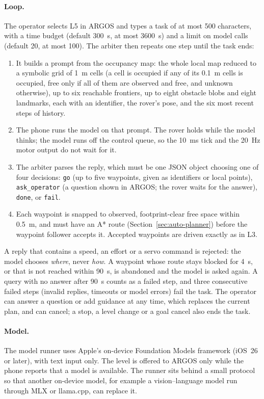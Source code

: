 \paragraph{Loop.}
The operator selects L5 in ARGOS and types a task of at most 500 characters, with a time budget (default 300~s, at most 3600~s) and a limit on model calls (default 20, at most 100).
The arbiter then repeats one step until the task ends:
\begin{enumerate}
\item It builds a prompt from the occupancy map: the whole local map reduced to a symbolic grid of 1~m cells (a cell is occupied if any of its 0.1~m cells is occupied, free only if all of them are observed and free, and unknown otherwise), up to six reachable frontiers, up to eight obstacle blobs and eight landmarks, each with an identifier, the rover's pose, and the six most recent steps of history.
\item The phone runs the model on that prompt. The rover holds while the model thinks; the model runs off the control queue, so the 10~ms tick and the 20~Hz motor output do not wait for it.
\item The arbiter parses the reply, which must be one JSON object choosing one of four decisions: \texttt{go} (up to five waypoints, given as identifiers or local points), \texttt{ask\_operator} (a question shown in ARGOS; the rover waits for the answer), \texttt{done}, or \texttt{fail}.
\item Each waypoint is snapped to observed, footprint-clear free space within 0.5~m, and must have an A* route (Section~\ref{sec:auto-planner}) before the waypoint follower accepts it. Accepted waypoints are driven exactly as in L3.
\end{enumerate}
A reply that contains a speed, an effort or a servo command is rejected: the model chooses \emph{where}, never \emph{how}.
A waypoint whose route stays blocked for 4~s, or that is not reached within 90~s, is abandoned and the model is asked again.
A query with no answer after 90~s counts as a failed step, and three consecutive failed steps (invalid replies, timeouts or model errors) fail the task.
The operator can answer a question or add guidance at any time, which replaces the current plan, and can cancel; a stop, a level change or a goal cancel also ends the task.

\paragraph{Model.}
The model runner uses Apple's on-device Foundation Models framework (iOS~26 or later), with text input only.
The level is offered to ARGOS only while the phone reports that a model is available.
The runner sits behind a small protocol so that another on-device model, for example a vision--language model run through MLX or llama.cpp, can replace it.

